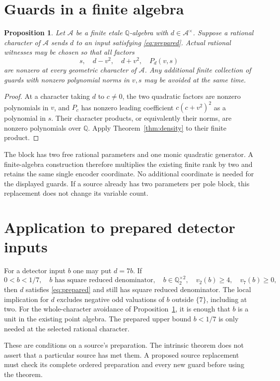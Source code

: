 \documentclass[11pt,a4paper]{article}
\newtheorem{proposition}[theorem]{Proposition}
\newcommand{\Q}{\mathbb Q}
\begin{document}
\section{Guards in a finite algebra}

\begin{proposition}\label{prop:guards}
Let $\mathcal A$ be a finite etale $\Q$-algebra with
$d\in\mathcal A^\times$. Suppose a rational character of
$\mathcal A$ sends $d$ to an input satisfying \eqref{eq:prepared}.
Actual rational witnesses may be chosen so that all factors
\[
 s,\quad d-v^2,\quad d+v^2,\quad P_d(v,s)
\]
are nonzero at every geometric character of $\mathcal A$.
Any additional finite collection of guards with nonzero polynomial
norms in $v,s$ may be avoided at the same time.
\end{proposition}
\begin{proof}
At a character taking $d$ to $c\ne0$, the two quadratic factors
are nonzero polynomials in $v$, and $P_c$ has nonzero leading
coefficient $c(c+v^2)^2$ as a polynomial in $s$. Their character
products, or equivalently their norms, are nonzero polynomials over
$\Q$. Apply Theorem~\ref{thm:density} to their finite product.
\end{proof}

The block has two free rational parameters and one monic quadratic
generator. A finite-algebra construction therefore multiplies the
existing finite rank by two and retains the same single encoder
coordinate. No additional coordinate is needed for the displayed
guards. If a source already has two parameters per pole block, this
replacement does not change its variable count.

\section{Application to prepared detector inputs}

For a detector input $b$ one may put $d=7b$. If
\[
 0<b<1/7,\quad b\text{ has square reduced denominator},\quad
 b\in\Q_2^{\times2},\quad v_2(b)\ge4,\quad v_7(b)\ge0,
\]
then $d$ satisfies \eqref{eq:prepared} and still has square reduced
denominator. The local implication for $d$ excludes negative odd
valuations of $b$ outside $\{7\}$, including at two. For the
whole-character avoidance of Proposition~\ref{prop:guards}, it is
enough that $b$ is a unit in the existing point algebra. The prepared
upper bound $b<1/7$ is only needed at the selected rational character.

These are conditions on a source's preparation. The intrinsic theorem
does not assert that a particular source has met them. A proposed
source replacement must check its complete ordered preparation and
every new guard before using the theorem.
\end{document}
